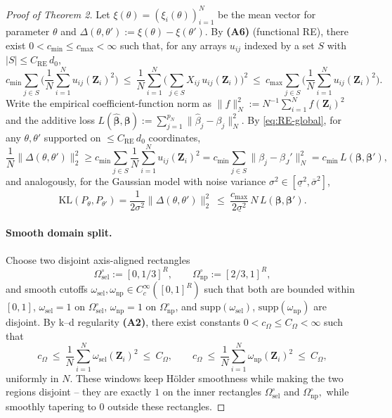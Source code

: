 \documentclass[11pt]{article}
\theoremstyle{plain}
\theoremstyle{definition}
\theoremstyle{plain}
\begin{document}
\begin{proof}[Proof of Theorem 2]
Let $\xi(\theta)=(\xi_i(\theta))_{i=1}^N$ be the mean vector for parameter $\theta$ and
$\Delta(\theta,\theta'):=\xi(\theta)-\xi(\theta')$.
By {\textbf{(A6)}} (functional RE), there exist $0<c_{\min}\le c_{\max}<\infty$ such that,
for any arrays $u_{ij}$ indexed by a set $S$ with $|S|\le C_{\mathrm{RE}}\,d_0$,
\begin{equation}\label{eq:RE-global}
c_{\min}\sum_{j\in S}\Big(\frac{1}{N}\sum_{i=1}^N u_{ij}(\bm Z_i)^2\Big)
\ \le\
\frac{1}{N}\sum_{i=1}^N\Big(\sum_{j\in S} X_{ij}\,u_{ij}(\bm Z_i)\Big)^2
\ \le\
c_{\max}\sum_{j\in S}\Big(\frac{1}{N}\sum_{i=1}^N u_{ij}(\bm Z_i)^2\Big).
\end{equation}
Write the empirical coefficient-function norm as
$\|f\|_N^2:=N^{-1}\sum_{i=1}^N f(\bm Z_i)^2$ and the additive loss
$L(\widehat{\bm\beta},\bm\beta):=\sum_{j=1}^{p_N}\|\widehat\beta_j-\beta_j\|_N^2$.
By \eqref{eq:RE-global}, for any $\theta,\theta'$ supported on $\le C_{\mathrm{RE}}\,d_0$ coordinates,
\begin{equation}\label{eq:RE-link-loss}
\frac{1}{N}\big\|\Delta(\theta,\theta')\big\|_2^2
\ge c_{\min} \sum_{j \in S}\frac{1}{N} \sum_{i=1}^{N}u_{ij}(\bm{Z}_i)^2 = c_{\min} \sum_{j \in S} \|\beta_j-\beta_J ' \|_N ^2 = c_{\min}\,L(\bm\beta,\bm\beta'),
\end{equation}
and analogously, for the Gaussian model with noise variance $\sigma^2\in[\underline\sigma^2,\overline\sigma^2]$,
\begin{equation}\label{eq:RE-link-KL}
\mathrm{KL}\!\left(P_\theta,P_{\theta'}\right)
=\frac{1}{2\sigma^2}\|\Delta(\theta,\theta')\|_2^2
\ \le\ \frac{c_{\max}}{2\underline\sigma^2}\,N\,L(\bm\beta,\bm\beta').
\end{equation}

\paragraph{Smooth domain split.}
Choose two disjoint axis-aligned rectangles
\[
\Omega_{\mathrm{sel}}^\circ:=[0,1/3]^R,\qquad
\Omega_{\mathrm{np}}^\circ:=[2/3,1]^R,
\]
and smooth cutoffs $\omega_{\mathrm{sel}},\omega_{\mathrm{np}}\in C_c^\infty([0,1]^R)$ such that
both are bounded within $[0,1]$, $\omega_{\mathrm{sel}}=1$ on $\Omega_{\mathrm{sel}}^\circ$, 
$\omega_{\mathrm{np}}=1$ on $\Omega_{\mathrm{np}}^\circ$, and $\mathrm{supp}(\omega_{\mathrm{sel}})$, $\mathrm{supp}(\omega_{\mathrm{np}})$ are disjoint.
By k--d regularity {\textbf{(A2)}}, there exist constants $0<c_\Omega\le C_\Omega<\infty$ such that
\begin{equation}\label{eq:mass-rectangles-smooth}
c_\Omega\ \le\ \frac{1}{N}\sum_{i=1}^N \omega_{\mathrm{sel}}(\bm Z_i)^2\ \le\ C_\Omega,
\qquad
c_\Omega\ \le\ \frac{1}{N}\sum_{i=1}^N \omega_{\mathrm{np}}(\bm Z_i)^2\ \le\ C_\Omega,
\end{equation}
uniformly in $N$. These windows keep H\"older smoothness while making the two regions disjoint -- they are exactly $1$ on the inner rectangles $\Omega_{\mathrm{sel}} ^{\circ}$ and $\Omega_{\mathrm{np}} ^{\circ},$ while smoothly tapering to $0$ outside these rectangles. 



\end{proof}
\end{document}
